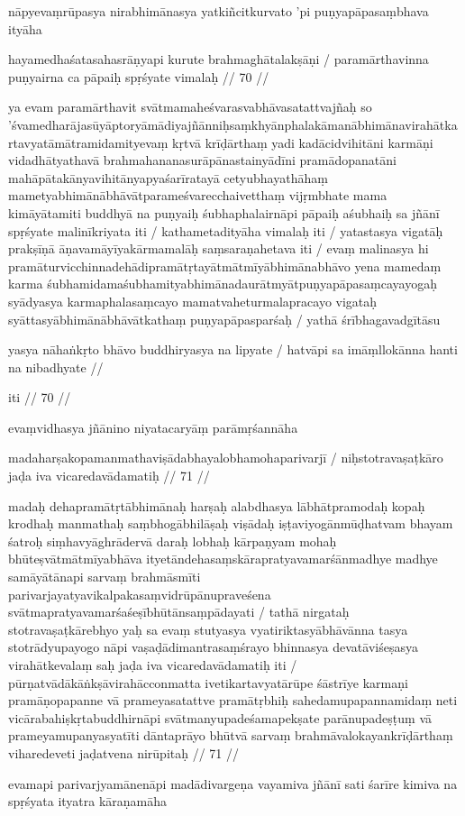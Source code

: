 nāpyevaṃrūpasya nirabhimānasya yatkiñcitkurvato 'pi puṇyapāpasaṃbhava ityāha

hayamedhaśatasahasrāṇyapi kurute brahmaghātalakṣāṇi  /
paramārthavinna puṇyairna ca pāpaiḥ spṛśyate vimalaḥ  // 70  //

ya evam paramārthavit svātmamaheśvarasvabhāvasatattvajñaḥ so 'śvamedharājasūyāptoryāmādiyajñānniḥsaṃkhyānphalakāmanābhimānavirahātkartavyatāmātramidamityevaṃ kṛtvā krīḍārthaṃ yadi kadācidvihitāni karmāṇi vidadhātyathavā brahmahananasurāpānastainyādīni pramādopanatāni mahāpātakānyavihitānyapyaśarīratayā cetyubhayathāhaṃ mametyabhimānābhāvātparameśvarecchaivetthaṃ vijṛmbhate mama kimāyātamiti buddhyā na puṇyaiḥ śubhaphalairnāpi pāpaiḥ aśubhaiḥ sa jñānī spṛśyate malinīkriyata iti  / kathametadityāha vimalaḥ iti  / yatastasya vigatāḥ prakṣīṇā āṇavamāyīyakārmamalāḥ saṃsaraṇahetava iti  / evaṃ malinasya hi pramāturvicchinnadehādipramātṛtayātmātmīyābhimānabhāvo yena mamedaṃ karma śubhamidamaśubhamityabhimānadaurātmyātpuṇyapāpasaṃcayayogaḥ syādyasya karmaphalasaṃcayo mamatvaheturmalapracayo vigataḥ syāttasyābhimānābhāvātkathaṃ puṇyapāpasparśaḥ  / yathā śrībhagavadgītāsu

yasya nāhaṅkṛto bhāvo buddhiryasya na lipyate  /
hatvāpi sa imāṃllokānna hanti na nibadhyate  //

iti  // 70  //

evaṃvidhasya jñānino niyatacaryāṃ parāmṛśannāha

madaharṣakopamanmathaviṣādabhayalobhamohaparivarjī  /
niḥstotravaṣaṭkāro jaḍa iva vicaredavādamatiḥ  // 71  //

madaḥ dehapramātṛtābhimānaḥ harṣaḥ alabdhasya lābhātpramodaḥ kopaḥ krodhaḥ manmathaḥ saṃbhogābhilāṣaḥ viṣādaḥ iṣṭaviyogānmūḍhatvam bhayam śatroḥ siṃhavyāghrādervā daraḥ lobhaḥ kārpaṇyam mohaḥ bhūteṣvātmātmīyabhāva ityetāndehasaṃskārapratyavamarśānmadhye madhye samāyātānapi sarvaṃ brahmāsmīti parivarjayatyavikalpakasaṃvidrūpānupraveśena svātmapratyavamarśaśeṣībhūtānsaṃpādayati  / tathā nirgataḥ stotravaṣaṭkārebhyo yaḥ sa evaṃ stutyasya vyatiriktasyābhāvānna tasya stotrādyupayogo nāpi vaṣaḍādimantrasaṃśrayo bhinnasya devatāviśeṣasya virahātkevalaṃ saḥ jaḍa iva vicaredavādamatiḥ iti  / pūrṇatvādākāṅkṣāvirahācconmatta ivetikartavyatārūpe śāstrīye karmaṇi pramāṇopapanne vā prameyasatattve pramātṛbhiḥ sahedamupapannamidaṃ neti vicārabahiṣkṛtabuddhirnāpi svātmanyupadeśamapekṣate parānupadeṣṭuṃ vā prameyamupanyasyatīti dāntaprāyo bhūtvā sarvaṃ brahmāvalokayankrīḍārthaṃ viharedeveti jaḍatvena nirūpitaḥ  // 71  //

evamapi parivarjyamānenāpi madādivargeṇa vayamiva jñānī sati śarīre kimiva na spṛśyata ityatra kāraṇamāha

